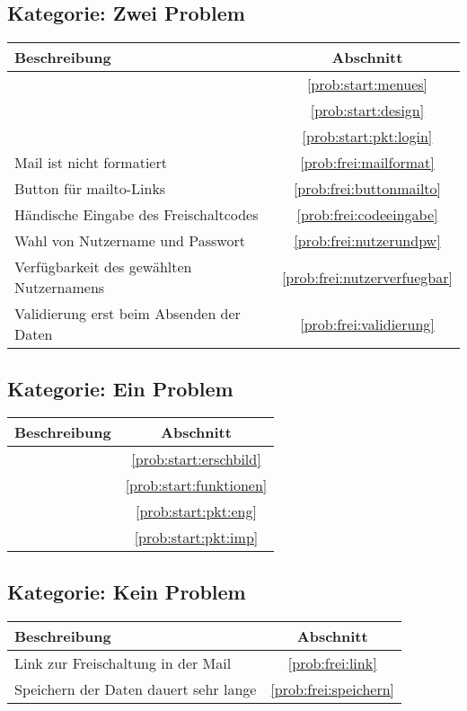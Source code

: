 \subsection*{Kategorie: Zwei Problem}
\begin{tabular}{|p{12cm}|c|}
\hline
\textbf{Beschreibung} & \textbf{Abschnitt} \\
\hline\hline
\nameref{prob:start:menues} & \ref{prob:start:menues} \\
\nameref{prob:start:design} & \ref{prob:start:design} \\
\nameref{prob:start:pkt:login} & \ref{prob:start:pkt:login}\\
Mail ist nicht formatiert & \ref{prob:frei:mailformat}\\
Button für mailto-Links & \ref{prob:frei:buttonmailto}\\
Händische Eingabe des Freischaltcodes & \ref{prob:frei:codeeingabe}\\
Wahl von Nutzername und Passwort & \ref{prob:frei:nutzerundpw}\\
Verfügbarkeit des gewählten Nutzernamens & \ref{prob:frei:nutzerverfuegbar}\\
Validierung erst beim Absenden der Daten & \ref{prob:frei:validierung}\\
\hline

\end{tabular}

\subsection*{Kategorie: Ein Problem}
\begin{tabular}{|p{12cm}|c|}
\hline
\textbf{Beschreibung} & \textbf{Abschnitt} \\
\hline\hline
\nameref{prob:start:erschbild} & \ref{prob:start:erschbild}\\
\nameref{prob:start:funktionen} & \ref{prob:start:funktionen}\\
\nameref{prob:start:pkt:eng} & \ref{prob:start:pkt:eng}\\
\nameref{prob:start:pkt:imp} & \ref{prob:start:pkt:imp}\\
\hline
\end{tabular}

\subsection*{Kategorie: Kein Problem}
\begin{tabular}{|p{12cm}|c|}
\hline
\textbf{Beschreibung} & \textbf{Abschnitt} \\
\hline\hline
Link zur Freischaltung in der Mail & \ref{prob:frei:link}\\
Speichern der Daten dauert sehr lange & \ref{prob:frei:speichern}\\
\hline
\end{tabular}
